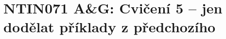 \documentclass[a4paper,12pt]{amsart}
\begin{document}
\thispagestyle{empty}

\section*{NTIN071 A\&G: Cvičení 5 -- jen dodělat příklady z předchozího}


\medskip


\medskip
\end{document}
